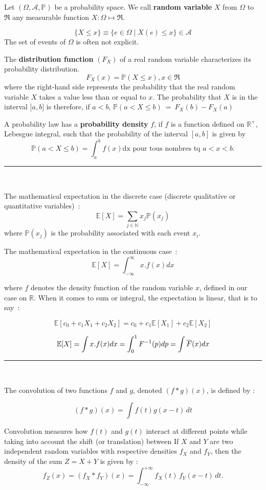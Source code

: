 \begin{f}
	
	Let \( (\Omega, \mathcal{A}, \mathbb{P})\) be a probability space. We call \textbf{random variable} \(X\) from \(\Omega\) to \( \Re\) any measurable function \(X:\Omega\mapsto \Re\).
	
	\[\lbrace X\leq x \rbrace\equiv \lbrace e\in \Omega \mid X(e)\leq x \rbrace \in   \mathcal{A}\]
	The set of events of \(\Omega\) is often not explicit.
	
	The \textbf{distribution function} \((F_X)\) of a real random variable characterizes its probability distribution.
	\[
	F_X(x)=\mathbb {P}(X\leq x), x\in \Re
	\]
	where the right-hand side represents the probability that the real random variable \(X\) takes a value less than or equal to \(x\).
	The probability that \(X\) is in the interval \(]a, b]\) is therefore, if \(a< b\),
	\(
	\mathbb{P}(a< X\leq b)\ =\ F_X(b)-F_X(a)
	\)
	
	A probability law has a \textbf{probability density} \(f\), if \(f\) is a function defined on \(\mathbb{R}^{+}\), Lebesgue integral, such that the probability of the interval \([a, b]\) is given by
	\[
	\mathbb{P}(a< X\leq b)=\int_a^b f(x) \mathrm{dx} \mbox{ pour tous nombres tq }a<x<b.
	\]
\end{f}
\hrule
\begin{f}[Expectations]{\ }
	
	The mathematical expectation in the discrete case (discrete qualitative or quantitative variables)~:
	\[
	\mathbb{E}[X]=\sum_{j\in \mathbb{N}}x_j\mathbb{P}(x_j)
	\]
	where \(\mathbb{P}(x_j)\) is the probability associated with each event \(x_i\).
	
	The mathematical expectation in the continuous case~:
	\[
	\mathbb{E}[X]=\int_{-\infty}^{\infty} x. f(x)dx
	\]
	
	where \(f\) denotes the density function of the random variable \(x\), defined in our case on \(\mathbb{R}\).
	When it comes to sum or integral, the expectation is linear, that is to say~:
	
	\[\mathbb{E}[c_0+c_1X_1+c_2X_2]=c_0+c_1\mathbb{E}[X_1]+c_2\mathbb{E}[X_2]\]
	
	\[
	\mathbb{E}[X]=\int x.f(x)dx =\int_0^1 F^{-1}(p)dp= \int \overline{F}(x)dx\\
	\] 
\end{f}
\hrule
\begin{f}{\ }
	
	The convolution of two functions \( f \) and \( g \), denoted \( (f * g)(x) \), is defined by :
	
	\[
	(f * g)(x) = \int f(t) g(x - t) \, dt
	\]
	
	Convolution measures how \( f(t) \) and \( g(t) \) interact at different points while taking into account the shift (or translation) between
	If \(X\) and \(Y\) are two independent random variables with respective densities \(f_X\) and \(f_Y\), then the density of the sum \(Z = X + Y\) is given by :
	\[
	f_Z(x) = (f_X * f_Y)(x) = \int_{-\infty}^{+\infty} f_X(t)\, f_Y(x - t)\, dt.
	\]
	
\end{f}

